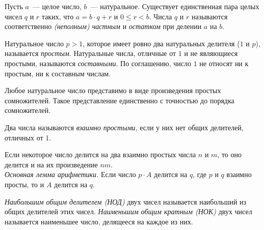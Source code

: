 %
%

Пусть $a$~--- целое число, $b$~--- натуральное.
Существует единственная пара целых чисел $q$ и $r$ таких, что
$a = b \cdot q + r$ и $0 \leq r < b$.
Числа $q$ и $r$ называются соответственно
\emph{(неполным) частным} и \emph{остатком} при делении $a$ на $b$.

Натуральное число $p > 1$, которое имеет ровно два натуральных делителя
($1$ и $p$), называется \emph{простым}.
Натуральные числа, отличные от $1$ и не являющиеся простыми, называются
\emph{составными}.
По соглашению, число $1$ не относят ни к простым, ни к составным числам.

Любое натуральное число представимо в виде произведения простых сомножителей.
Такое представление единственно с точностью до порядка сомножителей.

Два числа называются \emph{взаимно простыми}, если у них нет общих делителей,
отличных от 1.

\begin{problems}

\item
\sbp
Если некоторое число делится на два взаимно простых числа $n$ и $m$, то оно
делится и на их произведение $nm$.
\\
\sbp\emph{Основная лемма арифметики.}
Если число $p \cdot A$ делится на $q$, где $p$ и $q$ взаимно просты, то и $A$
делится на $q$.

\end{problems}

\emph{Наибольшим общим делителем (НОД)}
двух чисел называется наибольший из общих делителей этих чисел.
\emph{Наименьшим общим кратным (НОК)}
двух чисел называется наименьшее число, делящееся на каждое из них.

